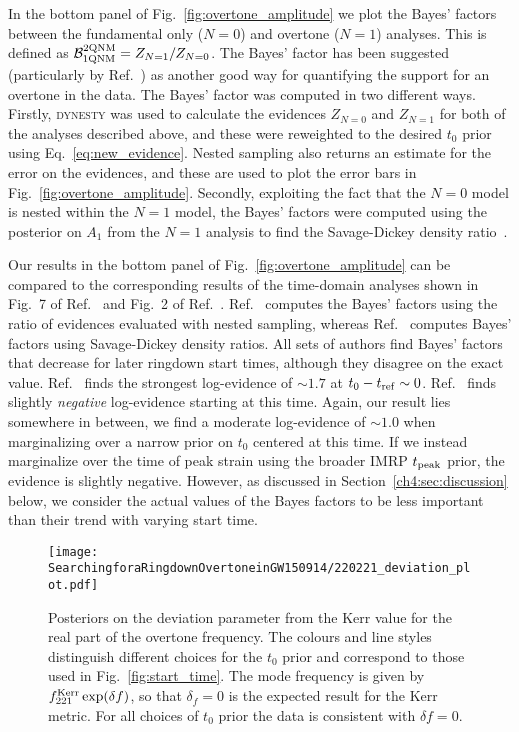 In the bottom panel of Fig.~\ref{fig:overtone_amplitude} we plot the Bayes' factors between the fundamental only ($N=0$) and overtone ($N=1$) analyses.
This is defined as $\mathcal{B}_{\rm 1QNM}^{\rm 2QNM}=Z_{N=1}/Z_{N=0}$.
The Bayes' factor has been suggested (particularly by Ref.~\cite{Cotesta:2022pci}) as another good way for quantifying the support for an overtone in the data.
The Bayes' factor was computed in two different ways.
Firstly, \textsc{dynesty} was used to calculate the evidences $Z_{N=0}$ and $Z_{N=1}$ for both of the analyses described above, and these were reweighted to the desired $t_0$ prior using Eq.~\ref{eq:new_evidence}. 
Nested sampling also returns an estimate for the error on the evidences, and these are used to plot the error bars in Fig.~\ref{fig:overtone_amplitude}.
Secondly, exploiting the fact that the $N=0$ model is nested within the $N=1$ model, the Bayes' factors were computed using the posterior on $A_1$ from the $N=1$ analysis to find the Savage-Dickey density ratio~\cite{10.2307/2958475}. 

Our results in the bottom panel of Fig.~\ref{fig:overtone_amplitude} can be compared to the corresponding results of the time-domain analyses shown in Fig.~7 of Ref.~\cite{Isi:2022mhy} and Fig.~2 of Ref.~\cite{Cotesta:2022pci}.
Ref.~\cite{Cotesta:2022pci} computes the Bayes' factors using the ratio of evidences evaluated with nested sampling, whereas Ref.~\cite{Isi:2022mhy} computes Bayes' factors using Savage-Dickey density ratios.
All sets of authors find Bayes' factors that decrease for later ringdown start times, although they disagree on the exact value.
Ref.~\cite{Isi:2022mhy} finds the strongest log-evidence of $\sim 1.7$ at $t_0-t_{\rm ref} \sim 0$.
Ref.~\cite{Cotesta:2022pci} finds slightly \emph{negative} log-evidence starting at this time.
Again, our result lies somewhere in between, we find a moderate log-evidence of $\sim 1.0$ when marginalizing over a narrow prior on $t_0$ centered at this time.
If we instead marginalize over the time of peak strain using the broader IMRP $t_{\rm peak}$ prior, the evidence is slightly negative.
However, as discussed in Section~\ref{ch4:sec:discussion} below, we consider the actual values of the Bayes factors to be less important than their trend with varying start time.

\begin{figure}[t]
    \centering
    \texttt{[image: SearchingforaRingdownOvertoneinGW150914/220221\_deviation\_plot.pdf]}
    \caption[Posteriors on the deviation from the Kerr for the real part of the GW150914 overtone frequency]{ 
    Posteriors on the deviation parameter from the Kerr value for the real part of the overtone frequency.
    The colours and line styles distinguish different choices for the $t_0$ prior and correspond to those used in Fig.~\ref{fig:start_time}.
    The mode frequency is given by $f_{221}^{\rm Kerr} \exp(\delta f)$, so that $\delta_f=0$ is the expected result for the Kerr metric.
    For all choices of $t_0$ prior the data is consistent with $\delta f=0$.
    }
    \label{fig:delta_f}
\end{figure}


